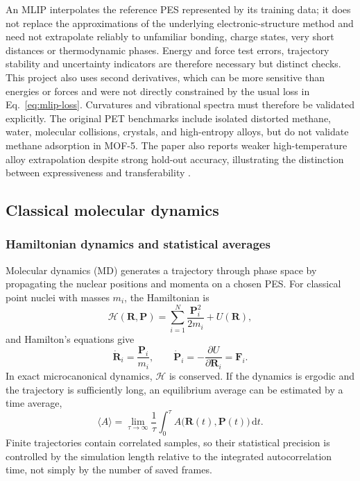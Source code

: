 \documentclass[10pt,a4paper,twocolumn]{article}
\begin{document}
An MLIP interpolates the reference PES represented by its training data; it
does not replace the approximations of the underlying electronic-structure
method and need not extrapolate reliably to unfamiliar bonding, charge states,
very short distances or thermodynamic phases. Energy and force test errors,
trajectory stability and uncertainty indicators are therefore necessary but
distinct checks. This project also uses second derivatives, which can be more
sensitive than energies or forces and were not directly constrained by the
usual loss in Eq.~\eqref{eq:mlip-loss}. Curvatures and vibrational spectra must
therefore be validated explicitly. The original PET benchmarks include
isolated distorted methane, water, molecular collisions, crystals, and
high-entropy alloys, but do not validate methane adsorption in MOF-5. The
paper also reports weaker high-temperature alloy extrapolation despite strong
hold-out accuracy, illustrating the distinction between expressiveness and
transferability \cite{pet}.

\subsection{Classical molecular dynamics}
\label{sec:classical-md-theory}

\subsubsection{Hamiltonian dynamics and statistical averages}

Molecular dynamics (MD) generates a trajectory through phase space by
propagating the nuclear positions and momenta on a chosen PES. For classical
point nuclei with masses $m_i$, the Hamiltonian is
\begin{equation}
  \mathcal H(\bm R,\bm P)
  =\sum_{i=1}^{N}\frac{\bm P_i^2}{2m_i}+U(\bm R),
  \label{eq:classical-hamiltonian}
\end{equation}
and Hamilton's equations give
\begin{equation}
  \dot{\bm R}_i=\frac{\bm P_i}{m_i},
  \qquad
  \dot{\bm P}_i=-\frac{\partial U}{\partial\bm R_i}
  =\bm F_i.
  \label{eq:hamilton-equations}
\end{equation}
In exact microcanonical dynamics, $\mathcal H$ is conserved. If the dynamics
is ergodic and the trajectory is sufficiently long, an equilibrium average
can be estimated by a time average,
\begin{equation}
  \langle A\rangle
  =\lim_{\tau\to\infty}\frac{1}{\tau}
   \int_0^\tau A\bigl(\bm R(t),\bm P(t)\bigr)\,\mathrm dt.
  \label{eq:ergodic-average}
\end{equation}
Finite trajectories contain correlated samples, so their statistical
precision is controlled by the simulation length relative to the integrated
autocorrelation time, not simply by the number of saved frames.
\end{document}
